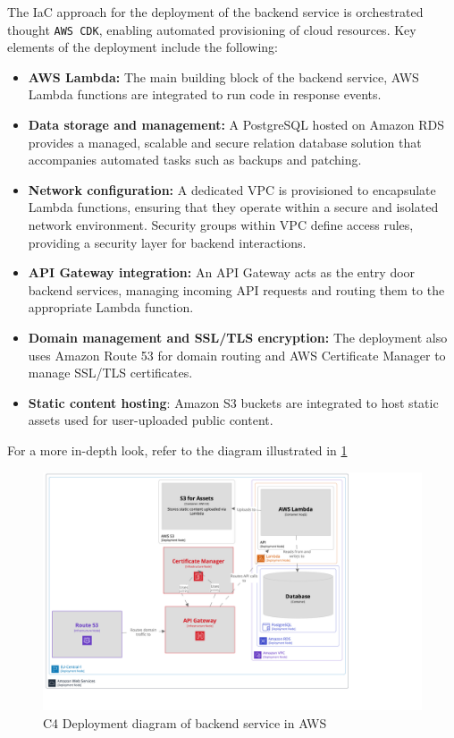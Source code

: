 The \ac{IaC} approach for the deployment of the backend service is orchestrated thought \texttt{AWS CDK}, enabling automated provisioning of cloud resources.
Key elements of the deployment include the following:
\begin{itemize}
    \item \textbf{AWS Lambda:} The main building block of the backend service, AWS Lambda functions are integrated to run code in response events.
    \item \textbf{Data storage and management:} A PostgreSQL hosted on Amazon \ac{RDS} provides a managed, scalable and secure relation database solution that accompanies automated tasks such as backups and patching.
    \item \textbf{Network configuration:} A dedicated \ac{VPC} is provisioned to encapsulate Lambda functions, ensuring that they operate within a secure and isolated network environment. Security groups within \ac{ VPC} define access rules, providing a security layer for backend interactions.
    \item \textbf{API Gateway integration:} An API Gateway acts as the entry door backend services, managing incoming API requests and routing them to the appropriate Lambda function.
    \item \textbf{Domain management and \ac{SSL}/\ac{TLS} encryption:} The deployment also uses Amazon Route 53 for domain routing and \ac{AWS} Certificate Manager to manage \ac{SSL}/\ac{TLS} certificates. 
    \item \textbf{Static content hosting}: Amazon \ac{S3} buckets are integrated to host static assets used for user-uploaded public content.
\end{itemize}

For a more in-depth look, refer to the diagram illustrated in \ref{img06:fig_lambda}

\begin{figure}[p]\centering
\includegraphics[width=140mm]{img/chap06/fig_lambda.png}
\caption{C4 Deployment diagram of backend service in AWS}
\label{img06:fig_lambda}
\end{figure}


